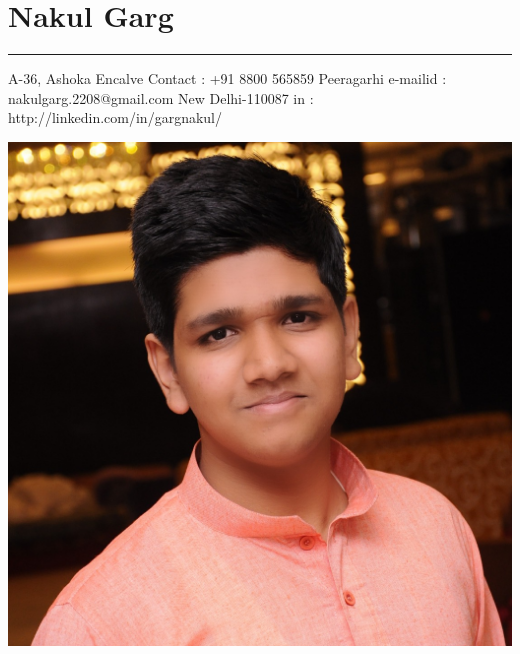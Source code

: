 \documentclass[a4paper]{article}
\author{Nakul Garg}
\begin{document}
	\section*{\center\textbf\Huge Nakul Garg}
		\hrule
		
		\vspace{2mm}
		A-36, Ashoka Encalve  \hfill {Contact : +91 8800 565859} \newline
		Peeragarhi \hfill {e-mailid : nakulgarg.2208@gmail.com} \newline
		New Delhi-110087 \hfill  {in : http://linkedin.com/in/gargnakul/} \\ 
		\begin{center}
		\includegraphics[scale=0.07]{profile}
		\end{center}
		\centering
\end{document}
